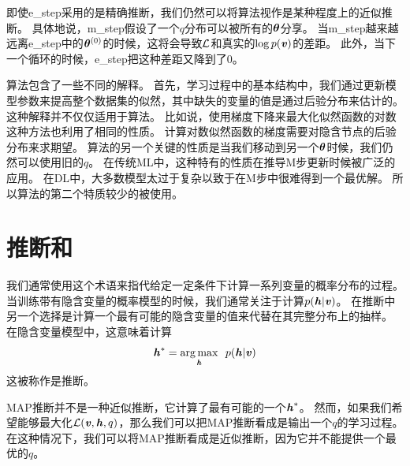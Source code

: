即使\gls{e_step}采用的是精确推断，我们仍然可以将算法视作是某种程度上的近似推断。
具体地说，\gls{m_step}假设了一个$q$分布可以被所有的$\boldsymbol{\theta}$分享。
当\gls{m_step}越来越远离\gls{e_step}中的$\boldsymbol{\theta}^{(0)}$的时候，这将会导致$\mathcal{L}$和真实的$\log p(\boldsymbol{\mathit{v}})$的差距。
此外，当下一个循环的时候，\gls{e_step}把这种差距又降到了0。



算法包含了一些不同的解释。
首先，学习过程中的基本结构中，我们通过更新模型参数来提高整个数据集的似然，其中缺失的变量的值是通过后验分布来估计的。
这种解释并不仅仅适用于算法。
比如说，使用梯度下降来最大化似然函数的对数这种方法也利用了相同的性质。
计算对数似然函数的梯度需要对隐含节点的后验分布来求期望。 
算法的另一个关键的性质是当我们移动到另一个$\boldsymbol{\theta}$时候，我们仍然可以使用旧的$q$。
在传统\gls{ML}中，这种特有的性质在推导M步更新时候被广泛的应用。
在\gls{DL}中，大多数模型太过于复杂以致于在M步中很难得到一个最优解。
所以算法的第二个特质较少的被使用。


\section{推断和}
\label{sec:map_inference_and_sparse_coding}


我们通常使用这个术语来指代给定一定条件下计算一系列变量的概率分布的过程。
当训练带有隐含变量的概率模型的时候，我们通常关注于计算$p(\boldsymbol{\mathit{h}}\vert\boldsymbol{\mathit{v}})$。
在推断中另一个选择是计算一个最有可能的隐含变量的值来代替在其完整分布上的抽样。
在隐含变量模型中，这意味着计算
\begin{align}
\boldsymbol{\mathit{h}}^* = \underset{\boldsymbol{\mathit{h}}}{\arg\max} \ \  p(\boldsymbol{\mathit{h}}\vert\boldsymbol{\mathit{v}})
\end{align}
这被称作是推断。



\gls{MAP}推断并不是一种近似推断，它计算了最有可能的一个$\boldsymbol{\mathit{h}}^*$。
然而，如果我们希望能够最大化$\mathcal{L}(\boldsymbol{\mathit{v}},\boldsymbol{\mathit{h}},q)$，那么我们可以把\gls{MAP}推断看成是输出一个$q$的学习过程。%
在这种情况下，我们可以将\gls{MAP}推断看成是近似推断，因为它并不能提供一个最优的$q$。



